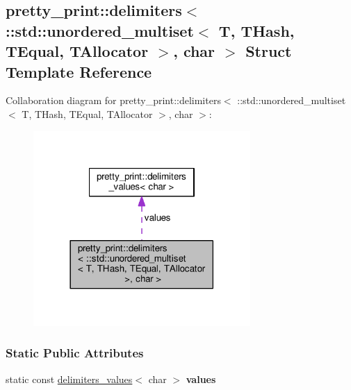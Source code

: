 \hypertarget{structpretty__print_1_1delimiters_3_01_1_1std_1_1unordered__multiset_3_01T_00_01THash_00_01TEqua5962598375835d6c8f207a9a7f10e137}{}\subsection{pretty\+\_\+print\+:\+:delimiters$<$ \+:\+:std\+:\+:unordered\+\_\+multiset$<$ T, T\+Hash, T\+Equal, T\+Allocator $>$, char $>$ Struct Template Reference}
\label{structpretty__print_1_1delimiters_3_01_1_1std_1_1unordered__multiset_3_01T_00_01THash_00_01TEqua5962598375835d6c8f207a9a7f10e137}


Collaboration diagram for pretty\+\_\+print\+:\+:delimiters$<$ \+:\+:std\+:\+:unordered\+\_\+multiset$<$ T, T\+Hash, T\+Equal, T\+Allocator $>$, char $>$\+:
\nopagebreak
\begin{figure}[H]
\begin{center}
\leavevmode
\includegraphics[width=234pt]{structpretty__print_1_1delimiters_3_01_1_1std_1_1unordered__multiset_3_01T_00_01THash_00_01TEqua8bcba5c078f9f6f856bdb7ee0d7e8272}
\end{center}
\end{figure}
\subsubsection*{Static Public Attributes}
\begin{DoxyCompactItemize}
\item 
static const \hyperlink{structpretty__print_1_1delimiters__values}{delimiters\+\_\+values}$<$ char $>$ {\bfseries values}\hypertarget{structpretty__print_1_1delimiters_3_01_1_1std_1_1unordered__multiset_3_01T_00_01THash_00_01TEqua5962598375835d6c8f207a9a7f10e137_aeed4005717413153ee04d74e514ba081}{}\label{structpretty__print_1_1delimiters_3_01_1_1std_1_1unordered__multiset_3_01T_00_01THash_00_01TEqua5962598375835d6c8f207a9a7f10e137_aeed4005717413153ee04d74e514ba081}

\end{DoxyCompactItemize}



